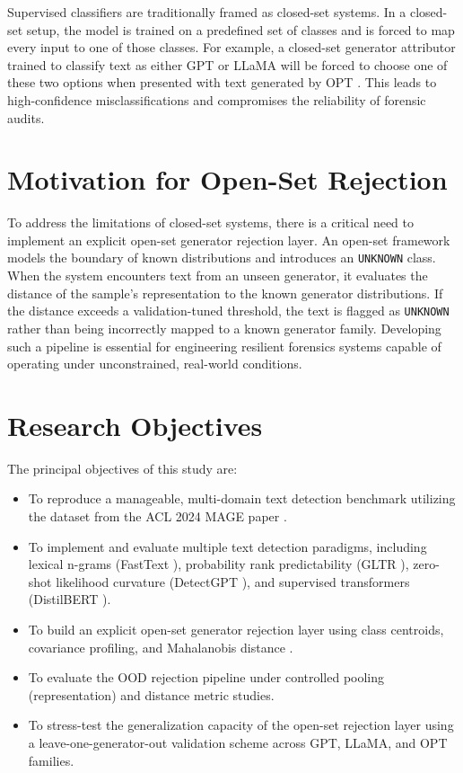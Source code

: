 Supervised classifiers are traditionally framed as closed-set systems. In a closed-set setup, the model is trained on a predefined set of classes and is forced to map every input to one of those classes. For example, a closed-set generator attributor trained to classify text as either GPT or LLaMA will be forced to choose one of these two options when presented with text generated by OPT \cite{zhang2022opt}. This leads to high-confidence misclassifications and compromises the reliability of forensic audits.

\section{Motivation for Open-Set Rejection}\label{Chapter-1-Motivation}
\noindent To address the limitations of closed-set systems, there is a critical need to implement an explicit open-set generator rejection layer. An open-set framework models the boundary of known distributions and introduces an \texttt{UNKNOWN} class. When the system encounters text from an unseen generator, it evaluates the distance of the sample's representation to the known generator distributions. If the distance exceeds a validation-tuned threshold, the text is flagged as \texttt{UNKNOWN} rather than being incorrectly mapped to a known generator family. Developing such a pipeline is essential for engineering resilient forensics systems capable of operating under unconstrained, real-world conditions.

\section{Research Objectives}\label{Chapter-1-Objectives}
\noindent The principal objectives of this study are:
\begin{itemize}
    \item To reproduce a manageable, multi-domain text detection benchmark utilizing the dataset from the ACL 2024 MAGE paper \cite{li-etal-2024-mage}.
    \item To implement and evaluate multiple text detection paradigms, including lexical n-grams (FastText \cite{joulin2016bag}), probability rank predictability (GLTR \cite{gehrmann2019gltr}), zero-shot likelihood curvature (DetectGPT \cite{mitchell2023detectgpt}), and supervised transformers (DistilBERT \cite{sanh2019distilbert}).
    \item To build an explicit open-set generator rejection layer using class centroids, covariance profiling, and Mahalanobis distance \cite{mahalanobis1936generalized}.
    \item To evaluate the OOD rejection pipeline under controlled pooling (representation) and distance metric studies.
    \item To stress-test the generalization capacity of the open-set rejection layer using a leave-one-generator-out validation scheme across GPT, LLaMA, and OPT families.
\end{itemize}